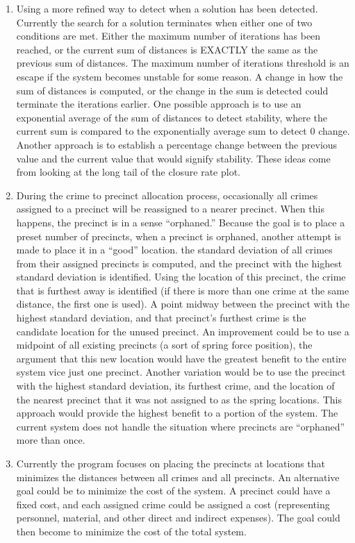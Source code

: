 \begin{enumerate}
\item Using a more refined way to detect when a solution has been detected.  Currently the search for a solution terminates when either one of two conditions are met.  Either the maximum number of iterations has been reached, or the current sum of distances is EXACTLY the same as the previous sum of distances.  The maximum number of iterations threshold is an escape if the system becomes unstable for some reason.  A change in how the sum of distances is computed, or the change in the sum is detected could terminate the iterations earlier.  One possible approach is to use an exponential average of the sum of distances to detect stability, where the current sum is compared to the exponentially average sum to detect 0 change.  Another approach is to establish a percentage change between the previous value and the current value that would signify stability.  These ideas come from looking at the long tail of the closure rate plot.
\item During the crime to precinct allocation process, occasionally all crimes assigned to a precinct will be reassigned to a nearer precinct.  When this happens, the precinct is in a sense ``orphaned.''  Because the goal is to place a preset number of precincts, when a precinct is orphaned, another attempt is made to place it in a ``good'' location.  the standard deviation of all crimes from their assigned precincts is computed, and the precinct with the highest standard deviation is identified.  Using the location of this precinct, the crime that is furthest away is identified (if there is more than one crime at the same distance, the first one is used).  A point midway between the precinct with the highest standard deviation, and that precinct's furthest crime is the candidate location for the unused precinct.  An improvement could be to use a midpoint of all existing precincts (a sort of spring force position), the argument that this new location would have the greatest benefit to the entire system vice just one precinct.  Another variation would be to use the precinct with the highest standard deviation, its furthest crime, and the location of the nearest precinct that it was not assigned to as the spring locations.  This approach would provide the highest benefit to a portion of the system.  The current system does not handle the situation where precincts are ``orphaned'' more than once.
\item Currently the program focuses on placing the precincts at locations that minimizes the distances between all crimes and all precincts.  An alternative goal could be to minimize the cost of the system.  A precinct could have a fixed cost, and each assigned crime could be assigned a cost (representing personnel, material, and other direct and indirect expenses).  The goal could then become to minimize the cost of the total system.

\end{enumerate}
